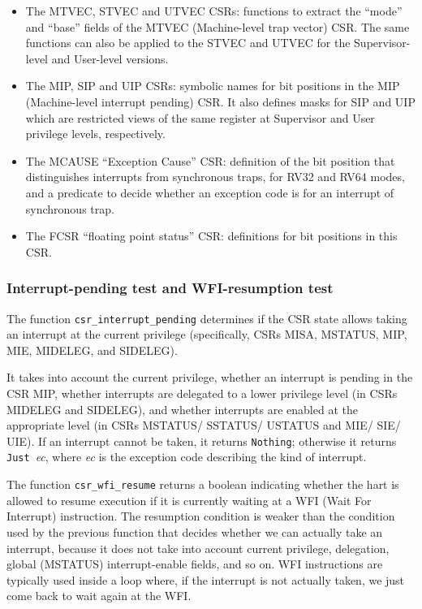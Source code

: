 \documentclass[11pt]{article}
\begin{document}
\begin{itemize}

\item The MTVEC, STVEC and UTVEC CSRs: functions to extract the
``mode'' and ``base'' fields of the MTVEC (Machine-level trap vector)
CSR.  The same functions can also be applied to the STVEC and UTVEC
for the Supervisor-level and User-level versions.

\item The MIP, SIP and UIP CSRs: symbolic names for bit positions in
the MIP (Machine-level interrupt pending) CSR.  It also defines masks
for SIP and UIP which are restricted views of the same register at
Supervisor and User privilege levels, respectively.

\item The MCAUSE ``Exception Cause'' CSR: definition of the bit
position that distinguishes interrupts from synchronous traps, for
RV32 and RV64 modes, and a predicate to decide whether an exception
code is for an interrupt of synchronous trap.

\item The FCSR ``floating point status'' CSR: definitions for bit
positions in this CSR.

\end{itemize}



\subsubsection{Interrupt-pending test and WFI-resumption test}

\label{csr_interrupt_pending}

The function \verb|csr_interrupt_pending| determines if the CSR state
allows taking an interrupt at the current privilege (specifically,
CSRs MISA, MSTATUS, MIP, MIE, MIDELEG, and SIDELEG).

It takes into account the current privilege, whether an interrupt is
pending in the CSR MIP, whether interrupts are delegated to a lower
privilege level (in CSRs MIDELEG and SIDELEG), and whether interrupts
are enabled at the appropriate level (in CSRs MSTATUS/ SSTATUS/
USTATUS and MIE/ SIE/ UIE).  If an interrupt cannot be taken, it
returns \verb|Nothing|; otherwise it returns \verb|Just|~\emph{ec},
where \emph{ec} is the exception code describing the kind of
interrupt.

The function \verb|csr_wfi_resume| returns a boolean indicating
whether the hart is allowed to resume execution if it is currently
waiting at a WFI (Wait For Interrupt) instruction.  The resumption
condition is weaker than the condition used by the previous function
that decides whether we can actually take an interrupt, because it
does not take into account current privilege, delegation, global
(MSTATUS) interrupt-enable fields, and so on.  WFI instructions are
typically used inside a loop where, if the interrupt is not actually
taken, we just come back to wait again at the WFI.
\end{document}
